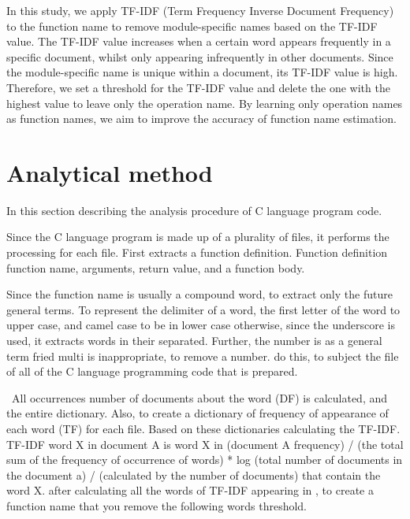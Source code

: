 \documentclass[JIP]{apris}
\begin{document}
In this study, we apply TF-IDF (Term Frequency Inverse Document Frequency)\cite{ramos2003using} to the function name to remove module-specific names based on the TF-IDF value. The TF-IDF value increases when a certain word appears frequently in a specific document, whilst only appearing infrequently in other documents. Since the module-specific name is unique within a document, its TF-IDF value is high. Therefore, we set a threshold for the TF-IDF value and delete the one with the highest value to leave only the operation name. By learning only operation names as function names, we aim to improve the accuracy of function name estimation. 

\section{Analytical method}
In this section describing the analysis procedure of C language program code.

Since the C language program is made up of a plurality of files, it performs the processing for each file. First extracts a function definition. Function definition function name, arguments, return value, and a function body.

Since the function name is usually a compound word, to extract only the future general terms. To represent the delimiter of a word, the first letter of the word to upper case, and camel case to be in lower case otherwise, since the underscore is used, it extracts words in their separated. Further, the number is as a general term fried multi is inappropriate, to remove a number. do this, to subject the file of all of the C language programming code that is prepared.

 All occurrences number of documents about the word (DF) is calculated, and the entire dictionary. Also, to create a dictionary of frequency of appearance of each word (TF) for each file. Based on these dictionaries calculating the TF-IDF. TF-IDF word X in document A is word X in (document A frequency) / (the total sum of the frequency of occurrence of words) * log (total number of documents in the document a) / (calculated by the number of documents) that contain the word X. after calculating all the words of TF-IDF appearing in , to create a function name that you remove the following words threshold.
\end{document}

